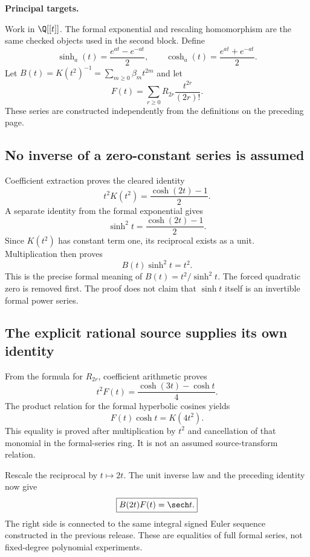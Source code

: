 \textbf{Principal targets.}\par
{}\par
{}
\par\medskip
{}
Work in $\Q[[t]]$. The formal exponential and rescaling homomorphism are the same checked objects used in the second block. Define
\[
 \sinh_a(t)=\frac{e^{at}-e^{-at}}2,\qquad
 \cosh_a(t)=\frac{e^{at}+e^{-at}}2.
\]
Let $B(t)=K(t^2)^{-1}=\sum_{m\geq0}\beta_mt^{2m}$ and let
\[
 F(t)=\sum_{r\geq0}R_{2r}\frac{t^{2r}}{(2r)!}.
\]
These series are constructed independently from the definitions on the preceding page.

\subsection*{No inverse of a zero-constant series is assumed}
Coefficient extraction proves the cleared identity
\[
 t^2K(t^2)=\frac{\cosh(2t)-1}{2}.
\]
A separate identity from the formal exponential gives
\[
 \sinh^2t=\frac{\cosh(2t)-1}{2}.
\]
Since $K(t^2)$ has constant term one, its reciprocal exists as a unit. Multiplication then proves
\[
 \boxed{B(t)\sinh^2t=t^2.}
\]
This is the precise formal meaning of $B(t)=t^2/\sinh^2t$. The forced quadratic zero is removed first. The proof does not claim that $\sinh t$ itself is an invertible formal power series.

\subsection*{The explicit rational source supplies its own identity}
From the formula for $R_{2r}$, coefficient arithmetic proves
\[
 \boxed{t^2 F(t)=\frac{\cosh(3t)-\cosh t}{4}.}
\]
The product relation for the formal hyperbolic cosines yields
\[
 F(t)\cosh t=K(4t^2).
\]
This equality is proved after multiplication by $t^2$ and cancellation of that monomial in the formal-series ring. It is not an assumed source-transform relation.

Rescale the reciprocal by $t\mapsto2t$. The unit inverse law and the preceding identity now give
\[
 \boxed{B(2t)F(t)=\sech t.}
\]
The right side is connected to the same integral signed Euler sequence constructed in the previous release. These are equalities of full formal series, not fixed-degree polynomial experiments.

